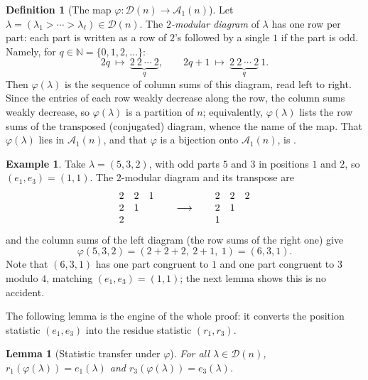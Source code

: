 \documentclass[11pt]{amsart}
\newtheorem{lemma}[theorem]{Lemma}
\theoremstyle{definition}
\newtheorem{definition}[theorem]{Definition}
\newtheorem{example}[theorem]{Example}
\theoremstyle{remark}
\newcommand{\D}{\mathcal D}
\newcommand{\Aone}{\mathcal A_1}
\begin{document}
\begin{definition}[The map \(\varphi:\D(n)\to\Aone(n)\)]\label{def:phi}
Let $\lambda = (\lambda_1>\cdots>\lambda_\ell)\in\D(n)$. The \emph{$2$-modular diagram} of $\lambda$ has one row per part: each part is written as a row of $2$'s followed by a single $1$ if the part is odd. Namely, for $q\in\mathbb{N}=\{0,1,2,\dots\}$:
$$2q\ \longmapsto\ \underbrace{2\ 2\ \cdots\ 2}_{q},
  \qquad
  2q+1\ \longmapsto\ \underbrace{2\ 2\ \cdots\ 2}_{q}\ 1 .
$$
Then \(\varphi(\lambda)\) is the sequence of column sums of this diagram, read left to right. Since the entries of each row weakly decrease along the row, the column sums weakly decrease, so $\varphi(\lambda)$ is a partition of $n$; equivalently, $\varphi(\lambda)$ lists the row sums of the transposed (conjugated) diagram, whence the name of the map. That $\varphi(\lambda)$ lies in $\Aone(n)$, and that $\varphi$ is a bijection onto $\Aone(n)$, is \cite[Lemma 2.2]{CGJL}.
\end{definition}

\begin{example}\label{ex:phi}
Take $\lambda=(5,3,2)$, with odd parts $5$ and $3$ in positions $1$ and $2$, so $(e_1,e_3)=(1,1)$. The $2$-modular diagram and its transpose are
\[
\begin{array}{@{}ccc@{}}
2 & 2 & 1\\
2 & 1 & \\
2 & &
\end{array}
\qquad\longrightarrow\qquad
\begin{array}{@{}ccc@{}}
2 & 2 & 2\\
2 & 1 & \\
1 & &
\end{array}
\]
and the column sums of the left diagram (the row sums of the right one) give
\[
   \varphi(5,3,2)=(2+2+2,\ 2+1,\ 1)=(6,3,1).
\]
Note that $(6,3,1)$ has one part congruent to $1$ and one part congruent to $3$ modulo $4$, matching $(e_1,e_3)=(1,1)$; the next lemma shows this is no accident.
\end{example}

The following lemma is the engine of the whole proof: it converts the position statistic $(e_1,e_3)$ into the residue statistic $(r_1,r_3)$.

\begin{lemma}[Statistic transfer under \(\varphi\)]\label{lem:phi}
For all $\lambda\in\D(n)$, $r_1(\varphi(\lambda))=e_1(\lambda)$ and $r_3(\varphi(\lambda))=e_3(\lambda)$.
\end{lemma}
\end{document}
